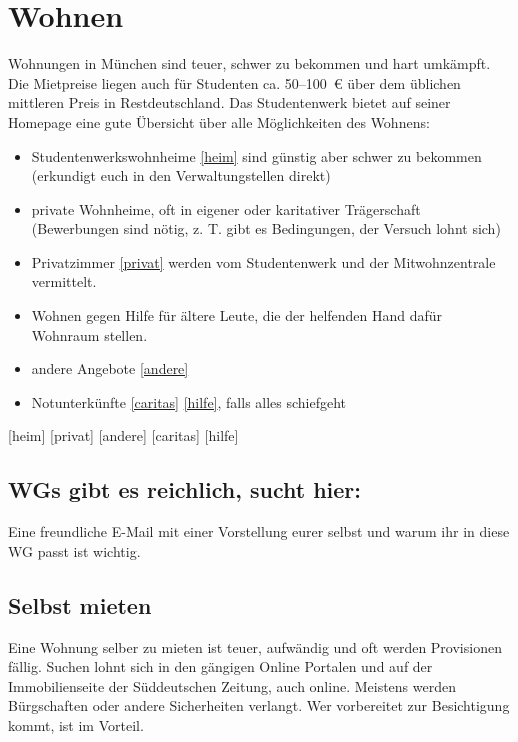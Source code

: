 \begin{urlList}
\end{urlList}

\section{Wohnen}
Wohnungen in München sind teuer, schwer zu bekommen und hart umkämpft. Die Mietpreise liegen
auch für Studenten ca. 50--100~€ über dem üblichen mittleren Preis in
Restdeutschland. Das Studentenwerk bietet auf seiner Homepage eine
gute Übersicht über alle Möglichkeiten des Wohnens:

\begin{itemize}
\item Studentenwerkswohnheime \ref{heim} sind 
	günstig aber schwer zu bekommen (erkundigt euch in den Verwaltungstellen direkt)
\item private Wohnheime, oft in eigener oder karitativer Trägerschaft
  (Bewerbungen sind nötig, z. T. gibt es Bedingungen, der Versuch lohnt sich)
\item
  Privatzimmer \ref{privat}
  werden vom Studentenwerk und der Mitwohnzentrale vermittelt.
\item Wohnen gegen Hilfe für ältere Leute, die der helfenden Hand dafür
  Wohnraum stellen.
\item andere Angebote \ref{andere}
\item Notunterkünfte \ref{caritas} \ref{hilfe}, falls alles schiefgeht
\end{itemize}

\begin{urlList}
	[heim]
	[privat]
	[andere]
	[caritas]
	[hilfe]
\end{urlList}


\subsection*{WGs gibt es reichlich, sucht hier:}
Eine freundliche E-Mail mit einer Vorstellung eurer selbst und warum ihr
in diese WG passt ist wichtig.

\begin{urlList}
\end{urlList}

\subsection*{Selbst mieten} 
Eine Wohnung selber zu mieten ist teuer, aufwändig und oft werden Provisionen fällig. Suchen
lohnt sich in den gängigen Online Portalen und auf der Immobilienseite der
Süddeutschen Zeitung, auch online. Meistens werden Bürgschaften oder andere
Sicherheiten verlangt.  Wer vorbereitet zur Besichtigung kommt, ist im Vorteil.
